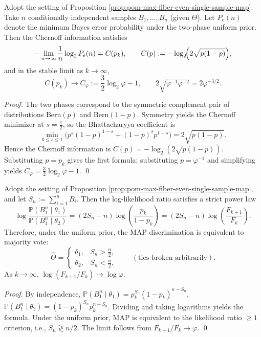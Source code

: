\begin{theorem}\label{thm:pom-max-fiber-even-chernoff-exponent}
Adopt the setting of Proposition \ref{prop:pom-max-fiber-even-single-sample-map}.
Take \(n\) conditionally independent samples \(B_1,\dots,B_n\) (given \(\Theta\)).
Let \(P_e(n)\) denote the minimum Bayes error probability under the two-phase uniform prior.
Then the Chernoff information satisfies
\[
-\lim_{n\to\infty}\frac{1}{n}\log_2 P_e(n)=C(p_k),
\qquad
C(p):=-\log_2\!\Bigl(2\sqrt{p(1-p)}\Bigr),
\]
and in the stable limit as \(k\to\infty\),
\[
\boxed{\;
C(p_k)\to C_\varphi:=\frac32\log_2\varphi-1,\qquad
2\sqrt{\varphi^{-1}\varphi^{-2}}=2\varphi^{-3/2}. \;}
\]
\end{theorem}

\begin{proof}
The two phases correspond to the symmetric complement pair of distributions \(\mathrm{Bern}(p)\) and \(\mathrm{Bern}(1-p)\).
Symmetry yields the Chernoff minimizer at \(s=\tfrac12\), so the Bhattacharyya coefficient is
\[
\min_{0\le s\le 1}\Big(p^s(1-p)^{1-s}+(1-p)^s p^{1-s}\Big)=2\sqrt{p(1-p)}.
\]
Hence the Chernoff information is \(C(p)=-\log_2(2\sqrt{p(1-p)})\).
Substituting \(p=p_k\) gives the first formula; substituting \(p=\varphi^{-1}\) and simplifying yields \(C_\varphi=\frac32\log_2\varphi-1\). \qed
\end{proof}

\begin{proposition}\label{prop:pom-max-fiber-even-majority-vote}
Adopt the setting of Proposition \ref{prop:pom-max-fiber-even-single-sample-map}, and let
\(
S_n:=\sum_{i=1}^{n}B_i
\).
Then the log-likelihood ratio satisfies a strict power law
\[
\log\frac{\mathbb{P}(B_1^n\mid\theta_1)}{\mathbb{P}(B_1^n\mid\theta_2)}
=(2S_n-n)\log\!\left(\frac{p_k}{1-p_k}\right)
=(2S_n-n)\log\!\left(\frac{F_{k+1}}{F_k}\right).
\]
Therefore, under the uniform prior, the MAP discrimination is equivalent to majority vote:
\[
\widehat\Theta=
\begin{cases}
\theta_1,& S_n>\frac n2,\\
\theta_2,& S_n<\frac n2,
\end{cases}
\qquad(\text{ties broken arbitrarily}).
\]
As \(k\to\infty\), \(\log(F_{k+1}/F_k)\to \log\varphi\).
\end{proposition}

\begin{proof}
By independence,
\(
\mathbb{P}(B_1^n\mid\theta_1)=p_k^{S_n}(1-p_k)^{n-S_n}
\),
\(
\mathbb{P}(B_1^n\mid\theta_2)=(1-p_k)^{S_n}p_k^{n-S_n}
\).
Dividing and taking logarithms yields the formula.
Under the uniform prior, MAP is equivalent to the likelihood ratio \(\ge 1\) criterion, i.e., \(S_n\gtrless n/2\).
The limit follows from \(F_{k+1}/F_k\to \varphi\). \qed
\end{proof}

